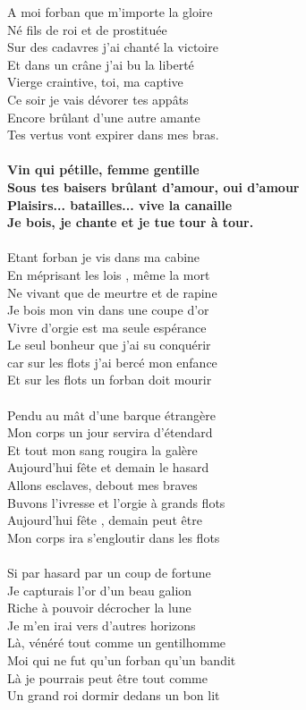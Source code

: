 A moi forban que m'importe la gloire \\
Né fils de roi et de prostituée \\
Sur des cadavres j'ai chanté la victoire \\
Et dans un crâne j'ai bu la liberté \\
Vierge craintive, toi, ma captive \\
Ce soir je vais dévorer tes appâts\\
Encore brûlant d'une autre amante \\
Tes vertus vont expirer dans mes bras.\\
\\
\textbf{Vin qui pétille, femme gentille \\
Sous tes baisers brûlant d'amour, oui d'amour \\
Plaisirs... batailles... vive la canaille \\
Je bois, je chante et je tue tour à tour.\\}
\\
Etant forban je vis dans ma cabine \\
En méprisant les lois , même la mort \\
Ne vivant que de meurtre et de rapine \\
Je bois mon vin dans une coupe d'or \\
Vivre d'orgie est ma seule espérance \\
Le seul bonheur que j'ai su conquérir \\
car sur les flots j'ai bercé mon enfance \\
Et sur les flots un forban doit mourir\\
\\
Pendu au mât d'une barque étrangère \\
Mon corps un jour servira d'étendard \\
Et tout mon sang rougira la galère \\
Aujourd'hui fête et demain le hasard \\
Allons esclaves, debout mes braves \\
Buvons l'ivresse et l'orgie à grands flots \\
Aujourd'hui fête , demain peut être\\
Mon corps ira s'engloutir dans les flots\\
\\
Si par hasard par un coup de fortune \\
Je capturais l'or d'un beau galion \\
Riche à pouvoir décrocher la lune \\
Je m'en irai vers d'autres horizons \\
Là, vénéré tout comme un gentilhomme\\
Moi qui ne fut qu'un forban qu'un bandit \\
Là je pourrais peut être tout comme\\
Un grand roi dormir dedans un bon lit\\
